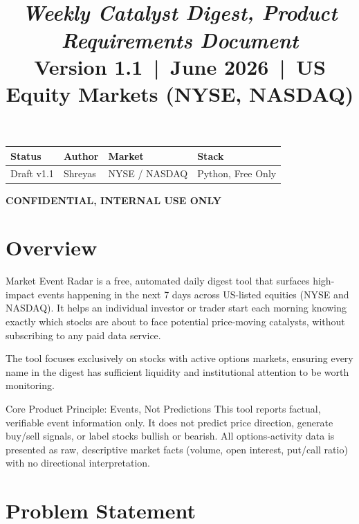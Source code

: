 \documentclass[11pt]{article}
\title{\vspace{-1.2em}{\Huge\bfseries\color{prdblue} MARKET EVENT RADAR}\\[0.3em]
{\large\itshape Weekly Catalyst Digest, Product Requirements Document}\\[0.5em]
{\normalsize Version 1.1 \,|\, June 2026 \,|\, US Equity Markets (NYSE, NASDAQ)}}
\author{}
\date{}
\begin{document}
\maketitle
\vspace{-3em}

\begin{center}
\begin{tabular}{|l|l|l|l|}
\hline
\textbf{Status} & \textbf{Author} & \textbf{Market} & \textbf{Stack} \\
\hline
Draft v1.1 & Shreyas & NYSE / NASDAQ & Python, Free Only \\
\hline
\end{tabular}

\vspace{0.8em}
\textbf{CONFIDENTIAL, INTERNAL USE ONLY}
\end{center}

\tableofcontents
\newpage

\section{Overview}

Market Event Radar is a free, automated daily digest tool that surfaces high-impact events happening in the next 7 days across US-listed equities (NYSE and NASDAQ). It helps an individual investor or trader start each morning knowing exactly which stocks are about to face potential price-moving catalysts, without subscribing to any paid data service.

The tool focuses exclusively on stocks with active options markets, ensuring every name in the digest has sufficient liquidity and institutional attention to be worth monitoring.

\begin{callout}{Core Product Principle: Events, Not Predictions}
This tool reports factual, verifiable event information only. It does not predict price direction, generate buy/sell signals, or label stocks bullish or bearish. All options-activity data is presented as raw, descriptive market facts (volume, open interest, put/call ratio) with no directional interpretation.
\end{callout}

\section{Problem Statement}
\end{document}
